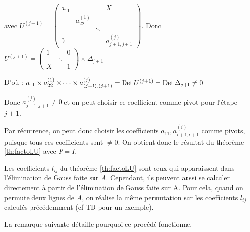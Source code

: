 \begin{preuve}
    avec $U^{(j+1)} = 
    \begin{pmatrix} 
        a_{11} & & & X \\
        & a_{22}^{(1)} & & \\
        & & \ddots & \\
        0 & & & a_{j+1,j+1}^{(j)}
    \end{pmatrix}$.
    Donc $U^{(j+1)} = 
            \begin{pmatrix}
                1 & & 0 \\
                & \ddots & \\
                X & & 1
            \end{pmatrix}
            \times \Delta_{j+1}$
            
            D'où : $a_{11} \times a_{22}^{(1)} \times \dots \times a^{(j)}_{(j+1),(j+1)} = \operatorname{Det} U^{(j+1)} = \operatorname{Det} \Delta_{j+1} \ne 0$ 
\end{preuve}

Donc $a^{(j)}_{j+1,j+1} \ne 0$ et on peut choisir ce coefficient comme pivot pour l'étape $j+1$.

Par récurrence, on peut donc choisir les coefficients $a_{11}, a_{i+1,i+1}^{(i)}$ comme pivots, puisque tous ces coefficients sont $\ne 0$. On obtient donc le résultat du théorème \ref{th:factoLU} avec $P=I$.


\begin{remark}
    Les coefficients $l_{ij}$ du théorème \ref{th:factoLU} sont ceux qui apparaissent dans l'élimination de Gauss faite sur $\tilde{A}$. Cependant, ils peuvent aussi se calculer directement à partir de l'élimination de Gauss faite sur A. Pour cela, quand on permute deux lignes de $A$, on réalise la même permutation sur les coefficients $l_{ij}$ calculés précédemment (cf TD pour un exemple).

    La remarque suivante détaille pourquoi ce procédé fonctionne.
\end{remark}

